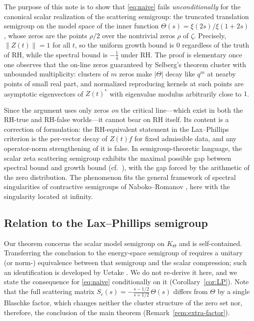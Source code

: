 \documentclass[11pt]{amsart}
\theoremstyle{remark}
\newcommand{\KT}{K_{\Theta}}
\begin{document}
The purpose of this note is to show that \eqref{eq:naive} fails
\emph{unconditionally} for the canonical scalar realization of the
scattering semigroup: the truncated translation semigroup on the model
space of the inner function $\Theta(s)=\xi(2s)/\xi(1+2s)$, whose zeros
are the points $\rho/2$ over the nontrivial zeros $\rho$ of $\zeta$.
Precisely, $\|Z(t)\|=1$ for all $t$, so the uniform growth bound is $0$
regardless of the truth of RH, while the spectral bound is $-\tfrac14$
under RH. The proof is elementary once one observes that the on-line
zeros guaranteed by Selberg's theorem \cite{Selberg} cluster with
unbounded multiplicity: clusters of $m$ zeros make $|\Theta|$ decay like
$q^{m}$ at nearby points of small real part, and normalized reproducing
kernels at such points are asymptotic eigenvectors of $Z(t)^{*}$ with
eigenvalue modulus arbitrarily close to $1$.

Since the argument uses only zeros \emph{on} the critical line---which
exist in both the RH-true and RH-false worlds---it cannot bear on RH
itself. Its content is a correction of formulation: the RH-equivalent
statement in the Lax--Phillips criterion is the per-vector decay of
$Z(t)f$ for fixed admissible data, and any operator-norm strengthening
of it is false. In semigroup-theoretic language, the scalar zeta
scattering semigroup exhibits the maximal possible gap between spectral
bound and growth bound (cf.\ \cite{EngelNagel, GearhartPruess}), with
the gap forced by the arithmetic of the zero distribution. The
phenomenon fits the general framework of spectral singularities of
contractive semigroups of Naboko--Romanov \cite{NabokoRomanov}, here
with the singularity located at infinity.

\subsection*{Relation to the Lax--Phillips semigroup}
Our theorem concerns the scalar model semigroup on $\KT$ and is
self-contained. Transferring the conclusion to the energy-space
semigroup of \cite{LaxPhillips} requires a unitary (or norm-)
equivalence between that semigroup and the scalar compression; such an
identification is developed by Uetake \cite{Uetake}. We do not re-derive
it here, and we state the consequence for \eqref{eq:naive}
conditionally on it (Corollary~\ref{cor:LP}). Note that the full
scattering matrix $S_{c}(s)=-\frac{s-1/2}{s+1/2}\,\Theta(s)$ differs
from $\Theta$ by a single Blaschke factor, which changes neither the
cluster structure of the zero set nor, therefore, the conclusion of the
main theorem (Remark~\ref{rem:extra-factor}).
\end{document}
